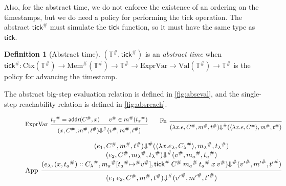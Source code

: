 \documentclass[acmsmall,review]{acmart}\settopmatter{printfolios=true,printccs=false,printacmref=false}
\theoremstyle{definition}
\newtheorem{definition}{Definition}[section]
\newcommand*{\cons}{::}
\newcommand*{\A}[1]{{#1}^{\#}}
\newcommand*{\ExprVar}{\text{ExprVar}}
\newcommand*{\Time}{\mathbb{T}}
\newcommand*{\ATime}{\A{\Time}}
\newcommand*{\Ctx}[1]{\text{Ctx}({#1})}
\newcommand*{\Value}[1]{\text{Val}({#1})}
\newcommand*{\mem}{m}
\newcommand*{\AMem}[1]{\A{\text{Mem}}({#1})}
\newcommand*{\addr}{\mathsf{addr}}
\newcommand*{\tick}{\mathsf{tick}}
\begin{document}
Also, for the abstract time, we do not enforce the existence of an ordering on the timestamps, but we do need a policy for performing the tick operation.
The abstract $\A\tick$ must simulate the $\tick$ function, so it must have the same type as $\tick$.
\begin{definition}[Abstract time]
  $(\ATime,\A{\tick})$ is an \emph{abstract time} when $\A{\tick}:\Ctx{\ATime}\rightarrow\AMem{\ATime}\rightarrow\ATime\rightarrow\ExprVar\rightarrow\Value{\ATime}\rightarrow\ATime$ is the policy for advancing the timestamp.
\end{definition}

The abstract big-step evaluation relation is defined in \ref{fig:abseval}, and the single-step reachability relation is defined in \ref{fig:absreach}.

\begin{figure}[h!]
  \begin{flushright}\fbox{$(e,\A{C},\A\mem,\A{t})\A\Downarrow(\A{V},\A{\mem'},\A{t'})$}\end{flushright}
  \footnotesize
  \[
    \begin{prooftree}
      \hypo{\A{t_{x}}=\addr(\A{C},x)}
      \hypo{\A{v}\in\A{\mem}(\A{t_{x}})}
      \infer[left label=ExprVar]2{
      (x, \A{C}, \A{\mem}, \A{t})
      \A{\Downarrow}
      (\A{v}, \A{\mem}, \A{t})
      }
    \end{prooftree}\qquad
    \begin{prooftree}
      \infer[left label=Fn]0{
      (\lambda x.e, \A{C}, \A{\mem}, \A{t})
      \A{\Downarrow}
      (\langle\lambda x.e, \A{C}\rangle, \A{\mem}, \A{t})
      }
    \end{prooftree}
  \]

  \[
    \begin{prooftree}
      \hypo{
        \begin{matrix}
          (e_{1}, \A{C}, \A{\mem}, \A{t})
          \A{\Downarrow}
          (\langle\lambda x.e_{\lambda}, \A{C_{\lambda}}\rangle, \A{\mem_{\lambda}}, \A{t_{\lambda}}) \\
          (e_{2}, \A{C}, \A{\mem_{\lambda}}, \A{t_{\lambda}})
          \A{\Downarrow}
          (\A{v}, \A{\mem_{a}}, \A{t_{a}})                                                            \\
          (e_{\lambda}, (x, \A{t_a})\cons \A{C_{\lambda}}, \A{\mem_{a}}[\A{t_{a}}\A{\mapsto} \A{v}], \A{\tick}\:\A{C}\:\A{\mem_a}\:\A{t_{a}}\:x\:\A{v})
          \A{\Downarrow}
          (\A{v'}, \A{\mem'},\A{t'})
        \end{matrix}
      }
      \infer[left label={App}]1{
      (e_{1}\:e_{2}, \A{C}, \A{\mem}, \A{t})
      \A{\Downarrow}
      (\A{v'}, \A{\mem'},\A{t'})
      }
    \end{prooftree}
  \]


\end{figure}
\end{document}
